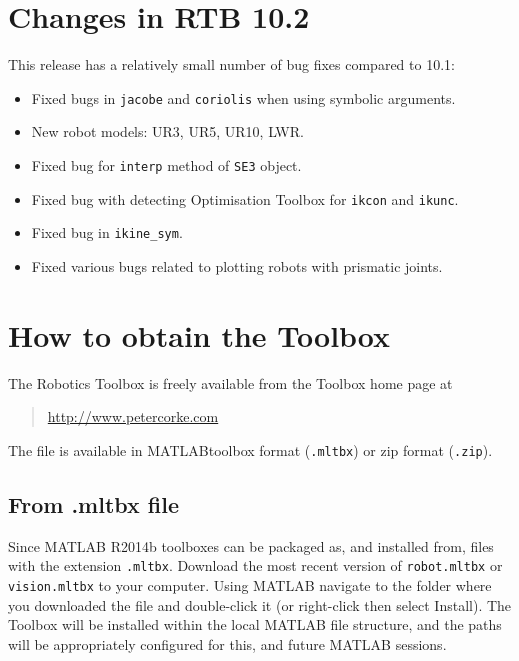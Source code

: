 \documentclass[a4paper,twoside]{report}
\def\Mlab{MATLAB}
\begin{document}
\section{Changes in RTB 10.2}
This release has a relatively small number of bug fixes compared to 10.1:
\begin{itemize}
\item Fixed bugs in \texttt{jacobe} and \texttt{coriolis} when using symbolic arguments.
\item New robot models: UR3, UR5, UR10, LWR.
\item Fixed bug for \texttt{interp} method of \texttt{SE3} object.
\item Fixed bug with detecting Optimisation Toolbox for \texttt{ikcon} and \texttt{ikunc}.
\item Fixed bug in \texttt{ikine\_sym}.
\item Fixed various bugs related to plotting robots with prismatic joints.
\end{itemize}


\section{How to obtain the Toolbox}
The Robotics Toolbox is freely available from the Toolbox home
page at 
\begin{quote}
\url{http://www.petercorke.com}
\end{quote}


The file is available in \Mlab toolbox format (\texttt{.mltbx}) or zip format (\texttt{.zip}). 

\subsection{From .mltbx file}
Since MATLAB R2014b toolboxes can be packaged as, and installed from, files with the extension \texttt{.mltbx}. Download the most recent version of \texttt{robot.mltbx} or \texttt{vision.mltbx} to your computer. Using MATLAB navigate to the folder where you downloaded the file and double-click it (or right-click then select Install). The Toolbox will be installed within the local MATLAB file structure, and the paths will be appropriately configured for this, and future MATLAB sessions.
\end{document}
